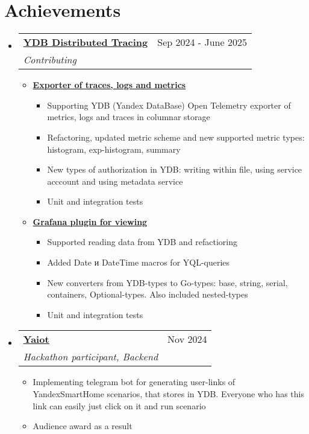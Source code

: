 \documentclass[letterpaper,10.8pt]{article}
\makeatletter
\newcommand{\resumeSubheadingProjects}[5]{
  \vspace{-1pt}\item
    \begin{tabular*}{0.97\textwidth}{l@{\extracolsep{\fill}}r}
      \textbf{#1} \mid {#2} & #3 \\
      \textit{\small#4} & \textit{\small #5} \\
    \end{tabular*}\vspace{-5pt}
}
\newcommand{\resumeSubHeadingListStart}{\begin{itemize}[leftmargin=*]}
\newcommand{\resumeSubHeadingListEnd}{\end{itemize}}
\makeatother
\begin{document}
\section{Achievements}
  \resumeSubHeadingListStart
    \resumeSubheadingProjects
    {\underline{YDB Distributed Tracing}}{Golang, OpenTelemetry, Grafana, YDB, testify}{Sep 2024 - June 2025}
    {Contributing}{}
    \begin{itemize}
        \item {\href{https://github.com/ydb-platform/opentelemetry-collector-contrib/pull/1}{\textbf{Exporter of traces, logs and metrics}}}
        \begin{itemize}
            \item {Supporting YDB (Yandex DataBase) Open Telemetry exporter of metrics, logs and traces in columnar storage}
            \item {Refactoring, updated metric scheme and new supported metric types: histogram, exp-histogram, summary}
            \item {New types of authorization in YDB: writing within file, using service acccount and using metadata service}
            \item {Unit and integration tests}
        \end{itemize}
        \item {\href{https://github.com/ydb-platform/ydb-grafana-datasource-plugin/pull/60}{\textbf{Grafana plugin for viewing}}}
        \begin{itemize}
            \item {Supported reading data from YDB and refactioring}
            \item {Added Date и DateTime macros for YQL-queries}
            \item {New converters from YDB-types to Go-types: base, string, serial, containers, Optional-types. Also included nested-types}
            \item {Unit and integration tests}
        \end{itemize}
    \end{itemize}
    
    \resumeSubheadingProjects
    {\href{https://cs-uni.ru/index.php?title=DDF23_\%D0\%9E\%D1\%87\%D0\%B5\%D0\%BD\%D1\%8C_\%D1\%83\%D0\%BC\%D0\%BD\%D1\%8B\%D0\%B9_\%D0\%B4\%D0\%BE\%D0\%BC}
    {\underline{Yaiot}}}{Python, YDB, aiogram}{Nov 2024}
    {Hackathon participant, Backend}{}
    \begin{itemize}
        \item {Implementing telegram bot for generating user-links of YandexSmartHome scenarios, that stores in YDB. Everyone who has this link can easily just click on it and run scenario}
        \item {Audience award as a result}
    \end{itemize}
\resumeSubHeadingListEnd
\end{document}
